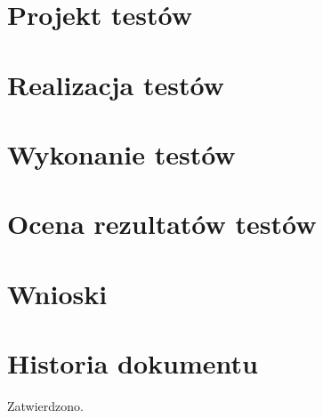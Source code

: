 \documentclass[10pt]{dokument-tiwo}
\begin{document}
\section{Projekt testów}


\section{Realizacja testów}


\section{Wykonanie testów}


\section{Ocena rezultatów testów}


\section{Wnioski}


\newpage
\section*{Historia dokumentu}
\begin{versions}
        Zatwierdzono.
\end{versions}
\end{document}
